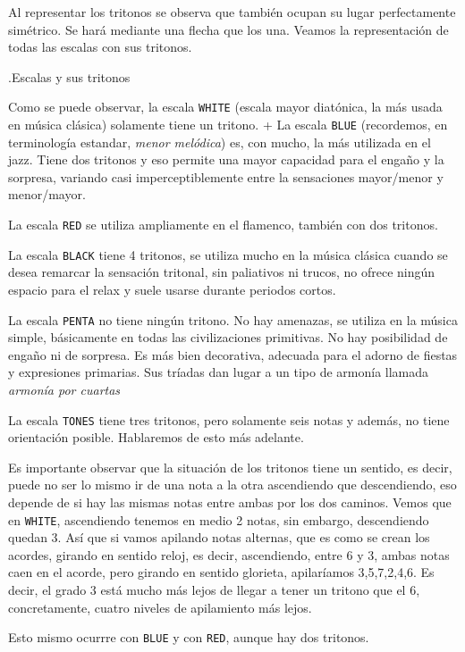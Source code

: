 \documentclass[]{article}
\begin{document}
Al representar los tritonos se observa que también ocupan su lugar perfectamente simétrico. Se hará mediante una flecha que los una. Veamos la representación de todas las escalas con sus tritonos.

.Escalas y sus tritonos

Como se puede observar, la escala \texttt{WHITE} (escala mayor diatónica, la más usada en música clásica) solamente tiene un tritono. + La escala \texttt{BLUE} (recordemos, en terminología estandar, \emph{menor melódica}) es, con mucho, la más utilizada en el jazz. Tiene dos tritonos y eso permite una mayor capacidad para el engaño y la sorpresa, variando casi imperceptiblemente entre la sensaciones mayor/menor y menor/mayor.

La escala \texttt{RED} se utiliza ampliamente en el flamenco, también con dos tritonos.

La escala \texttt{BLACK} tiene 4 tritonos, se utiliza mucho en la música clásica cuando se desea remarcar la sensación tritonal, sin paliativos ni trucos, no ofrece ningún espacio para el relax y suele usarse durante periodos cortos.

La escala \texttt{PENTA} no tiene ningún tritono. No hay amenazas, se utiliza en la música simple, básicamente en todas las civilizaciones primitivas. No hay posibilidad de engaño ni de sorpresa. Es más bien decorativa, adecuada para el adorno de fiestas y expresiones primarias. Sus tríadas dan lugar a un tipo de armonía llamada \emph{armonía por cuartas }

La escala \texttt{TONES} tiene tres tritonos, pero solamente seis notas y además, no tiene orientación posible. Hablaremos de esto más adelante.

Es importante observar que la situación de los tritonos tiene un sentido, es decir, puede no ser lo mismo ir de una nota a la otra ascendiendo que descendiendo, eso depende de si hay las mismas notas entre ambas por los dos caminos. Vemos que en \texttt{WHITE}, ascendiendo tenemos en medio 2 notas, sin embargo, descendiendo quedan 3. Así que si vamos apilando notas alternas, que es como se crean los acordes, girando en sentido reloj, es decir, ascendiendo, entre 6 y 3, ambas notas caen en el acorde, pero girando en sentido glorieta, apilaríamos 3,5,7,2,4,6. Es decir, el grado 3 está mucho más lejos de llegar a tener un tritono que el 6, concretamente, cuatro niveles de apilamiento más lejos.

Esto mismo ocurrre con \texttt{BLUE} y con \texttt{RED}, aunque hay dos tritonos.
\end{document}
